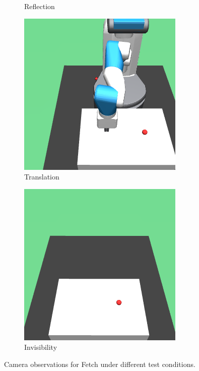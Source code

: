 \begin{figure}
\begin{subfigure}{0.19\textwidth}
    \caption{Reflection}
  \end{subfigure}
  \begin{subfigure}{0.19\textwidth}
    \includegraphics[width=\textwidth]{figures/chapter6/test_observations/translation}
    \caption{Translation}
  \end{subfigure}
  \begin{subfigure}{0.19\textwidth}
    \includegraphics[width=\textwidth]{figures/chapter6/test_observations/invisible}
    \caption{Invisibility}
  \end{subfigure}
  \caption{Camera observations for Fetch under different test conditions.}
  \label{fig:tests}
\end{figure}

